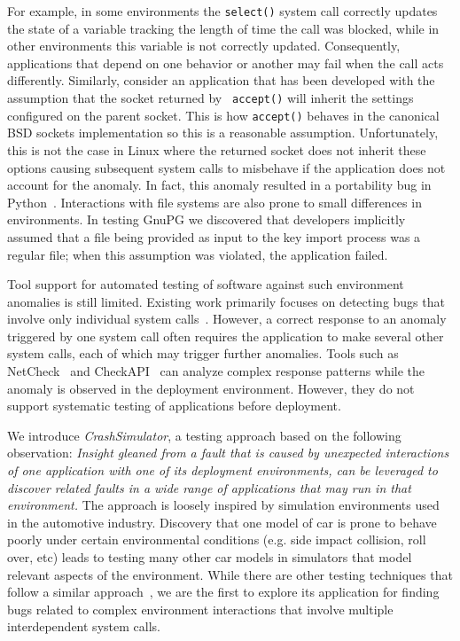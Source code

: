 For example, in some environments the {\tt select()} system call
correctly updates the state of a variable tracking the length of time
the call was blocked, while in other environments this variable is not
correctly updated.  Consequently, applications that depend on one
behavior or another may fail when the call acts
differently. Similarly, consider an application that has been
developed with the assumption that the socket returned by {\tt
  accept()} will inherit the settings configured on the parent socket.
This is how {\tt accept()} behaves in the canonical BSD sockets
implementation so this is a reasonable assumption.  Unfortunately,
this is not the case in Linux where the returned socket does not
inherit these options causing subsequent system calls to misbehave if
the application does not account for the anomaly. In fact, this
anomaly resulted in a portability bug in
Python~\cite{Zhuang_NSDI_2014}.  Interactions with file systems are
also prone to small differences in environments.  In testing GnuPG we
discovered that developers implicitly assumed that a file being
provided as input to the key import process was a regular file; when
this assumption was violated, the application failed.

Tool support for automated testing of software against such
environment anomalies is still limited. Existing work primarily
focuses on detecting bugs that involve only individual system
calls~\cite{Koopman00theexception,Dadeau:2008:CSM:1433121.1433137,Farchi02}. However,
a correct response to an anomaly triggered by one
system call often requires the application to make several other
system calls, each of which may trigger further anomalies. Tools such
as NetCheck~\cite{Zhuang_NSDI_2014} and
CheckAPI~\cite{rasley2015detecting} can analyze complex response
patterns while the anomaly is observed in the deployment
environment. However, they do not support systematic testing of
applications before deployment.

We introduce {\em CrashSimulator}, a testing approach based on the
following observation: {\em Insight gleaned from a fault that is
  caused by unexpected interactions of {\em one application} with one
  of its deployment environments, can be leveraged to discover related
  faults in a {\em wide range} of applications that may run in that
  environment.}  The approach is loosely inspired by simulation
environments used in the automotive industry. Discovery that one model
of car is prone to behave poorly under certain environmental
conditions (e.g. side impact collision, roll over, etc) leads to
testing many other car models in simulators that model relevant
aspects of the environment. While there are other testing techniques
that follow a similar approach~\cite{mariani2007compatibility,
  DBLP:journals/ase/WasylkowskiZ11, DBLP:conf/icse/PradelJAG12,
  DBLP:journals/tosem/MonperrusM13,
  DBLP:conf/icse/JamrozikSZ16}, we are the first to explore
its application for finding bugs related to complex environment
interactions that involve multiple interdependent system calls.

